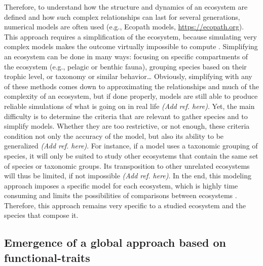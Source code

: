 Therefore, to understand how the structure and dynamics of an ecosystem are defined and how such complex relationships can last for several generations, numerical models are often used (e.g., Ecopath models, \url{https://ecopath.org}). This approach requires a simplification of the ecosystem, because simulating very complex models makes the outcome virtually impossible to compute \citep{albouy2011}. Simplifying an ecosystem can be done in many ways: focusing on specific compartments of the ecosystem (e.g., pelagic or benthic fauna), grouping species based on their trophic level, or taxonomy or similar behavior\ldots{} Obviously, simplifying with any of these methods comes down to approximating the relationships and much of the complexity of an ecosystem, but if done properly, models are still able to produce reliable simulations of what is going on in real life \emph{(Add ref. here)}. Yet, the main difficulty is to determine the criteria that are relevant to gather species and to simplify models. Whether they are too restrictive, or not enough, these criteria condition not only the accuracy of the model, but also its ability to be generalized \emph{(Add ref. here)}. For instance, if a model uses a taxonomic grouping of species, it will only be suited to study other ecosystems that contain the same set of species or taxonomic groups. Its transposition to other unrelated ecosystems will thus be limited, if not impossible \emph{(Add ref. here)}. In the end, this modeling approach imposes a specific model for each ecosystem, which is highly time consuming and limits the possibilities of comparisons between ecosystems \citep{martini2020, mcgill2006}. Therefore, this approach remains very specific to a studied ecosystem and the species that compose it. 


\subsection{Emergence of a global approach based on functional-traits}

